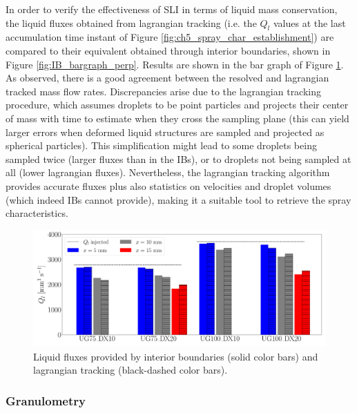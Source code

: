  In order to verify the effectiveness of SLI in terms of liquid mass conservation, the liquid fluxes obtained from lagrangian tracking (i.e. the $Q_l$ values at the last accumulation time instant of Figure \ref{fig:ch5_spray_char_establishment}) are compared to their equivalent obtained through interior boundaries, shown in Figure \ref{fig:IB_bargraph_perp}. Results are shown in the bar graph of Figure \ref{fig:fluxes_bargraph_IBs_vs_LGS}. As observed, there is a good agreement between the resolved and lagrangian tracked mass flow rates. Discrepancies arise due to the lagrangian tracking procedure, which assumes droplets to be point particles and projects their center of mass with time to estimate when they cross the sampling plane (this can yield larger errors when deformed liquid structures are sampled and projected as spherical particles). This simplification might lead to some droplets being sampled twice (larger fluxes than in the IBs), or to droplets not being sampled at all (lower lagrangian fluxes). Nevertheless, the lagrangian tracking algorithm provides accurate fluxes plus also statistics on velocities and droplet volumes (which indeed IBs cannot provide), making it a suitable tool to retrieve the spray characteristics.  



\begin{figure}[ht]
	\centering
   \includegraphics[scale=0.20]{./part2_developments/figures_ch5_resolved_JICF/SPRAY_characterization/establishment_and_fluxes/fluxes_SLI_vs_IBs}
   \caption{Liquid fluxes provided by interior boundaries (solid color bars) and lagrangian tracking (black-dashed color bars).}
   \label{fig:fluxes_bargraph_IBs_vs_LGS}
\end{figure}

\vspace*{-0.1in}

\subsubsection*{Granulometry}
\label{ch5:subsubsec_spray_char_granulo}

